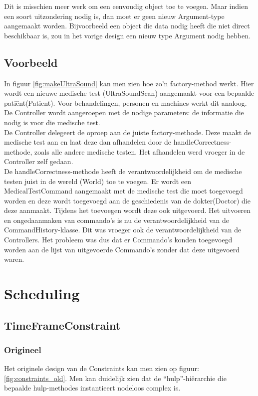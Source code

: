 Dit is misschien meer werk om een eenvoudig object toe te voegen.
Maar indien een soort uitzondering nodig is, dan moet er geen nieuw Argument-type aangemaakt worden. 
Bijvoorbeeld een object die data nodig heeft die niet direct beschikbaar is, zou in het vorige design een nieuw type Argument nodig hebben. 

\subsection{Voorbeeld}
In figuur \ref{fig:makeUltraSound} kan men zien hoe zo'n factory-method werkt. 
Hier wordt een nieuwe medische test (UltraSoundScan) aangemaakt voor een bepaalde patiënt(Patient).
Voor behandelingen, personen en machines werkt dit analoog. 
De Controller wordt aangeroepen met de nodige parameters: de informatie die nodig is voor die medische test. \\

De Controller delegeert de oproep aan de juiste factory-methode. 
Deze maakt de medische test aan en laat deze dan afhandelen door de handleCorrectness-methode, zoals alle andere medische testen. 
Het afhandelen werd vroeger in de Controller zelf gedaan. \\

De handleCorrectness-methode heeft de verantwoordelijkheid om de medische testen juist in de wereld (World) toe te voegen. 
Er wordt een MedicalTestCommand aangemaakt met de medische test die moet toegevoegd worden en deze wordt toegevoegd aan de geschiedenis van de dokter(Doctor) die deze aanmaakt. 
Tijdens het toevoegen wordt deze ook uitgevoerd. 
Het uitvoeren en ongedaanmaken van commando's is nu de verantwoordelijkheid van de CommandHistory-klasse.
Dit was vroeger ook de verantwoordelijkheid van de Controllers. 
Het probleem was dus dat er Commando's konden toegevoegd worden aan de lijst van uitgevoerde Commando's zonder dat deze uitgevoerd waren.


\section{Scheduling\label{scheduling}}
\subsection{TimeFrameConstraint}
\subsubsection{Origineel}
Het originele design van de Constraints kan men zien op figuur: \ref{fig:constraints_old}. 
Men kan duidelijk zien dat de ``hulp''-hiërarchie die bepaalde hulp-methodes instantieert nodeloos complex is.\\

